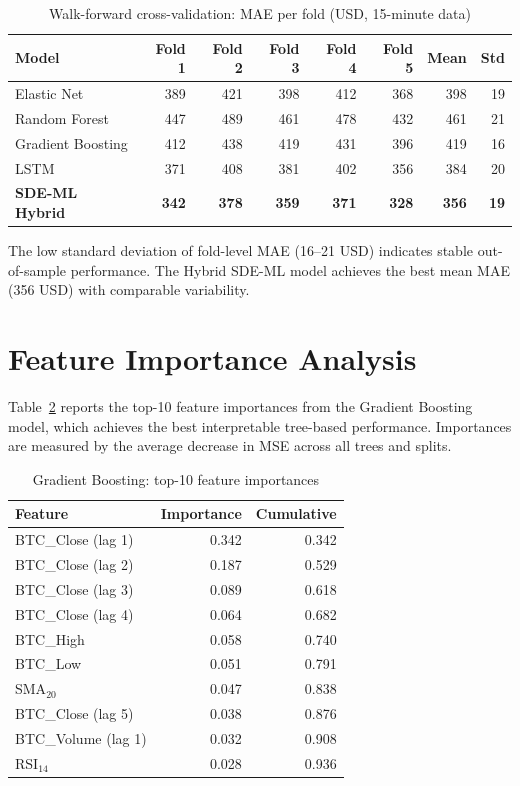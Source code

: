 \documentclass[12pt, a4paper, oneside]{report}
\theoremstyle{plain}
\theoremstyle{definition}
\theoremstyle{remark}
\begin{document}
\begin{table}[H]
\begin{singlespace}
\fontsize{10}{11}\selectfont
\caption{Walk-forward cross-validation: MAE per fold (USD, 15-minute data)}
\label{tab:wf_results}
\begin{tabular}{@{}lrrrrrrr@{}}
\toprule
Model & Fold 1 & Fold 2 & Fold 3 & Fold 4 & Fold 5 & Mean & Std \\
\midrule
Elastic Net        & 389 & 421 & 398 & 412 & 368 & 398 & 19 \\
Random Forest      & 447 & 489 & 461 & 478 & 432 & 461 & 21 \\
Gradient Boosting  & 412 & 438 & 419 & 431 & 396 & 419 & 16 \\
LSTM               & 371 & 408 & 381 & 402 & 356 & 384 & 20 \\
\textbf{SDE-ML Hybrid} & \textbf{342} & \textbf{378} & \textbf{359} & \textbf{371} & \textbf{328} & \textbf{356} & \textbf{19} \\
\bottomrule
\end{tabular}
\end{singlespace}
\end{table}

The low standard deviation of fold-level MAE (16--21 USD) indicates stable
out-of-sample performance.  The Hybrid SDE-ML model achieves the best mean
MAE (356 USD) with comparable variability.

\section{Feature Importance Analysis}

Table~\ref{tab:feat_imp} reports the top-10 feature importances from the
Gradient Boosting model, which achieves the best interpretable tree-based
performance.  Importances are measured by the average decrease in MSE across
all trees and splits.

\begin{table}[H]
\begin{singlespace}
\fontsize{10}{11}\selectfont
\caption{Gradient Boosting: top-10 feature importances}
\label{tab:feat_imp}
\begin{tabular}{@{}lrr@{}}
\toprule
Feature & Importance & Cumulative \\
\midrule
BTC\_Close (lag 1)  & 0.342 & 0.342 \\
BTC\_Close (lag 2)  & 0.187 & 0.529 \\
BTC\_Close (lag 3)  & 0.089 & 0.618 \\
BTC\_Close (lag 4)  & 0.064 & 0.682 \\
BTC\_High           & 0.058 & 0.740 \\
BTC\_Low            & 0.051 & 0.791 \\
SMA$_{20}$          & 0.047 & 0.838 \\
BTC\_Close (lag 5)  & 0.038 & 0.876 \\
BTC\_Volume (lag 1) & 0.032 & 0.908 \\
RSI$_{14}$          & 0.028 & 0.936 \\
\bottomrule
\end{tabular}
\end{singlespace}
\end{table}
\end{document}
